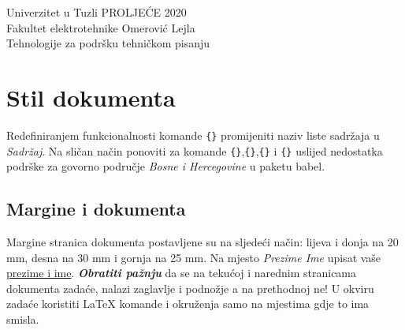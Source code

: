 \documentclass{article}
\newcommand{\newsize}[1]{\fontsize{8pt}{21pt}\selectfont{#1}}
\newcommand{\newtodo}[1]{\todo{\newsize{#1}}}
\begin{document}
\setcounter{page}{1}
\noindent Univerzitet u Tuzli \hfill{} PROLJEĆE 2020\\
\noindent Fakultet elektrotehnike \hfill{} {Omerović Lejla}\\
\noindent Tehnologije za podršku tehničkom pisanju
\vspace{5mm}
\begin{center}
\LARGE{}
\newtodo{Naslov dokument vertikalno je pomjeren za 5 mm u odnosu na prethodni i naredni sadržaj.}
\end{center}

\vspace{5mm}
\begin{abstract}
\textbf{\textit{U okviru zadaće}} biti će demonstrirano svo stečeno znanje iz predmeta Tehnologije za podršku tehničkom pisanju vezano za \LaTeX{}. Studenti će {\color{mycolor1}\textbf{\textsl{demonstrirati stečeno znanje}}} na način da repliciraju sadržaj dokumenta (stranice od 1 do 6) pri čemu moraju obratiti pažnju na svaki detalj u originalnom dokumentu. Replicirani dokument mora biti \underline{vjerodostojna kopija} originalnom dokumentu (100{\%} kopija osim dijela prezime i ime, i broj indeksa). Kako rezultat, studenti će {\color{blue}\textbf{\textsl{predati kod}}} (*.tex file i *.pdf).
\end{abstract}

\tableofcontents
\listoffigures
\listoftables
\section{Stil dokumenta}
Redefiniranjem funkcionalnosti komande \texttt{{}\{\}} promijeniti naziv liste sadržaja u \textsl{Sadržaj}. Na sličan način ponoviti za komande \texttt{{}\{\}},\texttt{{}\{\}},\texttt{{}\{\}} i \texttt{{}\{\}} uslijed nedostatka podrške za govorno područje \textsl{Bosne i Hercegovine} u paketu babel.
\newpage
\pagestyle{logo_stil}
\subsection{Margine i dokumenta}
Margine stranica dokumenta postavljene su na sljedeći način: lijeva i donja na 20 mm, desna na 30 mm i gornja na 25 mm. Na mjesto \textsl{Prezime Ime} upisat vaše \underline{prezime i ime}. {\textbf{\textsl{\color{mycolor1}Obratiti pažnju}}} da se na tekućoj i narednim stranicama dokumenta zadaće, nalazi zaglavlje i podnožje a na prethodnoj ne! U okviru zadaće koristiti \LaTeX{} komande i okruženja samo na mjestima gdje to ima smisla.
\end{document}
